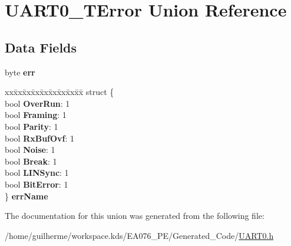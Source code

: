 \hypertarget{union_u_a_r_t0___t_error}{}\section{U\+A\+R\+T0\+\_\+\+T\+Error Union Reference}
\label{union_u_a_r_t0___t_error}
\subsection*{Data Fields}
\begin{DoxyCompactItemize}
\item 
\mbox{\label{union_u_a_r_t0___t_error_ae491a990547762d3d5fde88ea22a6c25}} 
byte {\bfseries err}
\item 
\mbox{\label{union_u_a_r_t0___t_error_a99455d3d9e37bd879f103a30d62ac8a1}} 
\begin{tabbing}
xx\=xx\=xx\=xx\=xx\=xx\=xx\=xx\=xx\=\kill
struct \{\\
\>bool {\bfseries OverRun}: 1\\
\>bool {\bfseries Framing}: 1\\
\>bool {\bfseries Parity}: 1\\
\>bool {\bfseries RxBufOvf}: 1\\
\>bool {\bfseries Noise}: 1\\
\>bool {\bfseries Break}: 1\\
\>bool {\bfseries LINSync}: 1\\
\>bool {\bfseries BitError}: 1\\
\} {\bfseries errName}\\

\end{tabbing}\end{DoxyCompactItemize}


The documentation for this union was generated from the following file\+:\begin{DoxyCompactItemize}
\item 
/home/guilherme/workspace.\+kds/\+E\+A076\+\_\+\+P\+E/\+Generated\+\_\+\+Code/\hyperlink{_u_a_r_t0_8h}{U\+A\+R\+T0.\+h}\end{DoxyCompactItemize}
